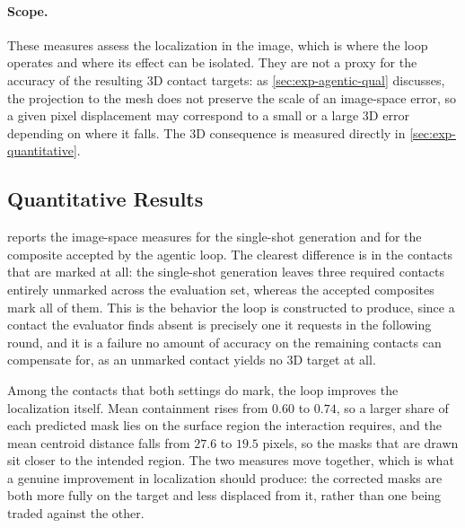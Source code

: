 \paragraph{Scope.} These measures assess the localization in the image, which is where the loop operates and where its effect can be isolated. They are not a proxy for the accuracy of the resulting 3D contact targets: as \cref{sec:exp-agentic-qual} discusses, the projection to the mesh does not preserve the scale of an image-space error, so a given pixel displacement may correspond to a small or a large 3D error depending on where it falls. The 3D consequence is measured directly in \cref{sec:exp-quantitative}.

\subsection{Quantitative Results}
\label{sec:exp-agentic-quant}

 reports the image-space measures for the single-shot generation and for the composite accepted by the agentic loop. The clearest difference is in the contacts that are marked at all: the single-shot generation leaves three required contacts entirely unmarked across the evaluation set, whereas the accepted composites mark all of them. This is the behavior the loop is constructed to produce, since a contact the evaluator finds absent is precisely one it requests in the following round, and it is a failure no amount of accuracy on the remaining contacts can compensate for, as an unmarked contact yields no 3D target at all.

Among the contacts that both settings do mark, the loop improves the localization itself. Mean containment rises from $0.60$ to $0.74$, so a larger share of each predicted mask lies on the surface region the interaction requires, and the mean centroid distance falls from $27.6$ to $19.5$ pixels, so the masks that are drawn sit closer to the intended region. The two measures move together, which is what a genuine improvement in localization should produce: the corrected masks are both more fully on the target and less displaced from it, rather than one being traded against the other.

